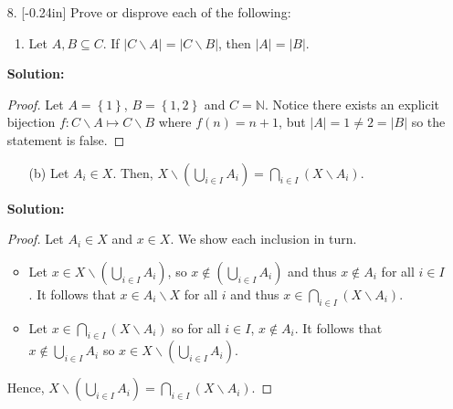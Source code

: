 \documentclass[letterpaper,12pt]{article}
\newcommand{\set}[1]{\left\{ #1 \right\}}
\theoremstyle{definition}
\begin{document}
\pagebreak
\begin{enumerate}
    \item[8.] \reversemarginpar{}[-0.24in] Prove or disprove each of the following: \begin{enumerate}
        \item Let $A,B \subseteq C$. If $|C \backslash A| = |C \backslash B|$, then $|A| = |B|$.
    \end{enumerate}
     \begin{mdframed}
            \textbf{Solution:}
            \renewcommand{\proofname}{Disproof}
            \begin{proof}
                 Let $A  = \set{1}$, $B = \set{1,2}$ and $C = \mathbb{N}$. Notice there exists an explicit bijection $f: C \backslash A \mapsto  C \backslash B$ where $f(n) = n+1$, but $|A| = 1 \neq 2 = |B|$ so the statement is false.
            \end{proof}
        \end{mdframed}
\end{enumerate}
\pagebreak
\begin{enumerate}
    \item[] \begin{enumerate}
        \item[(b)] Let $A_i \in X$. Then, $X \backslash (\bigcup_{i \in I} A_i)   = \bigcap_{i \in I} (X \backslash A_i )$.
    \end{enumerate}
     \begin{mdframed}
            \textbf{Solution:}
            \begin{proof}
                Let $A_i \in X$ and $x \in X$. We show each inclusion in turn.
                \begin{itemize}
                    \item Let $x \in X \backslash (\bigcup_{i \in I} A_i)$, so $x \notin (\bigcup_{i \in I} A_i)$ and thus $x \notin A_i$ for all $i \in I$. It follows that $x \in A_i \backslash X$ for all $i$ and thus $x \in  \bigcap_{i \in I} (X \backslash A_i)$.
                    \item Let $x \in  \bigcap_{i \in I} (X \backslash A_i)$ so for all $i \in I$, $x \notin A_i$. It follows that $x \notin \bigcup_{i \in I} A_i$ so $x \in X \backslash (\bigcup_{i \in I} A_i)$.
                \end{itemize}
                Hence, $X \backslash (\bigcup_{i \in I} A_i)   = \bigcap_{i \in I} (X \backslash A_i )$.
            \end{proof}
        \end{mdframed}
\end{enumerate}
\end{document}
